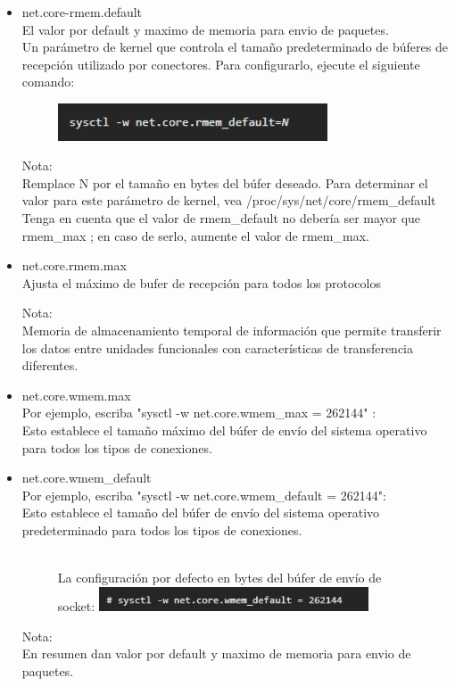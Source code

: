 \begin{itemize}
\item net.core-rmem.default
	\\El valor por default y maximo de memoria para envio de paquetes.
	\\Un parámetro de kernel que controla el tamaño predeterminado de búferes de recepción utilizado por conectores. Para configurarlo, ejecute el siguiente comando:

\begin{figure}[htb]
\begin{center}
\includegraphics[width=8cm]{./Imagenes/ajhordy}
\end{center}
\end{figure}

Nota:
\\Remplace N por el tamaño en bytes del búfer deseado. Para determinar el valor para este parámetro de kernel, vea {/proc/sys/net/core/rmem\_default} 
\\Tenga en cuenta que el valor de rmem\_default no debería ser mayor que rmem\_max ; en caso de serlo, aumente el valor de rmem\_max.

	\item net.core.rmem.max
	\\Ajusta el m\'aximo de bufer de recepci\'on para todos los protocolos
\vspace*{0.10in}


Nota:
\\Memoria de almacenamiento temporal de informaci\'on que permite transferir los datos entre unidades funcionales con caracter\'isticas de transferencia diferentes.

           \item net.core.wmem.max
\\Por ejemplo, escriba  "sysctl -w net.core.wmem_max = 262144" :
\\Esto establece el tamaño máximo del búfer de envío del sistema operativo para todos los tipos de conexiones.

           \item net.core.wmem_default
\\Por ejemplo, escriba  "sysctl -w net.core.wmem_default = 262144":  
\\Esto establece el tamaño del búfer de envío del sistema operativo predeterminado para todos los tipos de conexiones.

\begin{figure}[htb]
\begin{center}
\\La configuración por defecto en bytes del búfer de envío de socket:
\includegraphics[width=8cm]{./Imagenes/netcorewmendefault}
\end{center}
\end{figure}

Nota: 
\\En resumen dan valor por default y maximo de memoria para envio de paquetes.

\end{itemize} 

